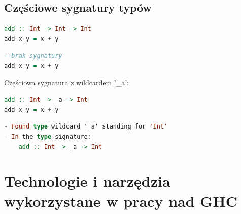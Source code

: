 \documentclass[polish]{beamer}
\makeatletter
\newcommand*{\currentname}{\@currentlabelname}
\makeatother
\begin{document}
\subsection{Częściowe sygnatury typów} %
\begin{frame}[t,fragile]{\currentname}
\begin{multicols}{2}
\begin{minipage}{0.4\textwidth}
\begin{block}{}
\begin{lstlisting}[language=Haskell,basicstyle=\tiny\ttfamily,keywordstyle=\color{alerted text.fg}]
add :: Int -> Int -> Int
add x y = x + y
\end{lstlisting}
\end{block}
\end{minipage}
\begin{minipage}{0.4\textwidth}
\begin{block}{}
\begin{lstlisting}[language=Haskell,basicstyle=\tiny\ttfamily,keywordstyle=\color{alerted text.fg}]
--brak sygnatury 
add x y = x + y
\end{lstlisting}
\end{block}
\end{minipage}
\end{multicols}

Częściowa sygnatura z wildcardem '\_a':
\begin{minipage}{1.0\textwidth}
\begin{block}{}
\begin{lstlisting}[language=Haskell,basicstyle=\tiny\ttfamily,keywordstyle=\color{alerted text.fg}]
add :: Int -> _a -> Int
add x y = x + y
\end{lstlisting}
\end{block}
\end{minipage}
\begin{minipage}{1.0\textwidth}
\begin{block}{}
\begin{lstlisting}[language=Haskell,basicstyle=\tiny\ttfamily,keywordstyle=\color{alerted text.fg}]
- Found type wildcard '_a' standing for 'Int'
- In the type signature:
    add :: Int -> _a -> Int
\end{lstlisting}
\end{block}
\end{minipage}
\end{frame}

\section{Technologie i narzędzia wykorzystane w pracy nad GHC} %
\end{document}
